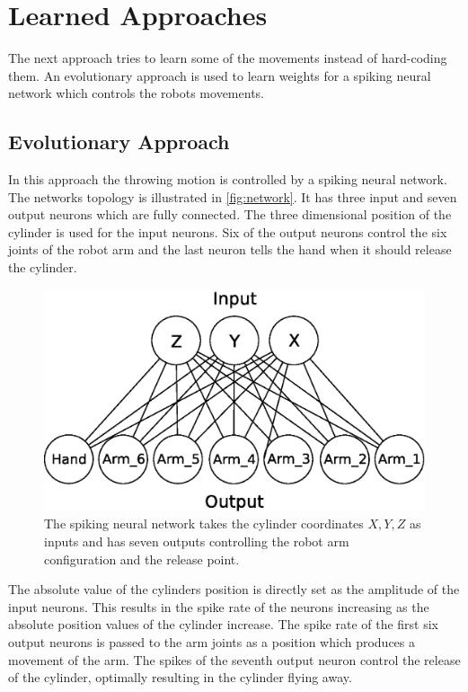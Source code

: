 \section{Learned Approaches}
\label{sec:learned}
The next approach tries to learn some of the movements instead of hard-coding them.
An evolutionary approach is used to learn weights for a spiking neural network which controls the robots movements.

\subsection{Evolutionary Approach}
In this approach the throwing motion is controlled by a spiking neural network.
The networks topology is illustrated in \autoref{fig:network}.
It has three input and seven output neurons which are fully connected.
The three dimensional position of the cylinder is used for the input neurons.
Six of the output neurons control the six joints of the robot arm and the last neuron tells the hand when it should release the cylinder.

\begin{figure}[h]
\centering
\includegraphics[width=.9\columnwidth]{figures/net2.eps}
\caption{The spiking neural network takes the cylinder coordinates $X, Y, Z$ as inputs and has seven outputs controlling the robot arm configuration and the release point.}
\label{fig:network}
\end{figure}

The absolute value of the cylinders position is directly set as the amplitude of the input neurons.
This results in the spike rate of the neurons increasing as the absolute position values of the cylinder increase.
The spike rate of the first six output neurons is passed to the arm joints as a position which produces a movement of the arm.
The spikes of the seventh output neuron control the release of the cylinder, optimally resulting in the cylinder flying away.

